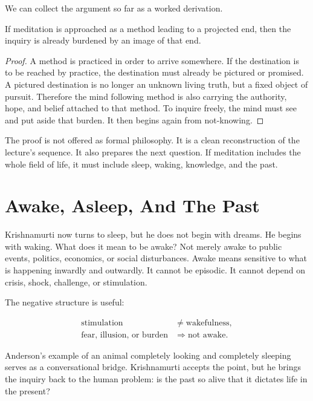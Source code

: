 We can collect the argument so far as a worked derivation.

\begin{proposition}
If meditation is approached as a method leading to a projected end, then the inquiry is already burdened by an image of that end.
\end{proposition}

\begin{proof}
A method is practiced in order to arrive somewhere. If the destination is to be reached by practice, the destination must already be pictured or promised. A pictured destination is no longer an unknown living truth, but a fixed object of pursuit. Therefore the mind following method is also carrying the authority, hope, and belief attached to that method. To inquire freely, the mind must see and put aside that burden. It then begins again from not-knowing.
\end{proof}

The proof is not offered as formal philosophy. It is a clean reconstruction of the lecture's sequence. It also prepares the next question. If meditation includes the whole field of life, it must include sleep, waking, knowledge, and the past.

\section{Awake, Asleep, And The Past}

Krishnamurti now turns to sleep, but he does not begin with dreams. He begins with waking. What does it mean to be awake? Not merely awake to public events, politics, economics, or social disturbances. Awake means sensitive to what is happening inwardly and outwardly. It cannot be episodic. It cannot depend on crisis, shock, challenge, or stimulation.

The negative structure is useful:

\begin{align}
\text{stimulation} &\neq \text{wakefulness},\\
\text{fear, illusion, or burden} &\Rightarrow \text{not awake}.
\end{align}

Anderson's example of an animal completely looking and completely sleeping serves as a conversational bridge. Krishnamurti accepts the point, but he brings the inquiry back to the human problem: is the past so alive that it dictates life in the present?

